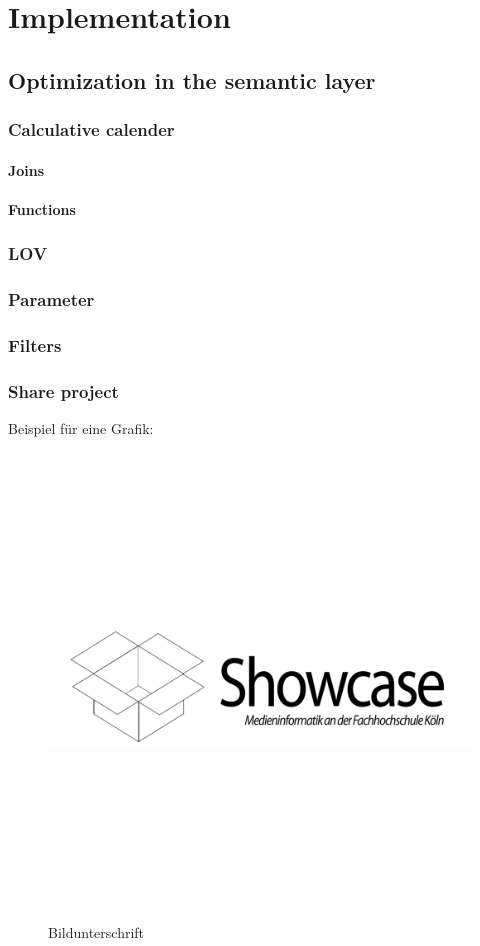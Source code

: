\chapter{Implementation}

\section{Optimization in the semantic layer}
\subsection{Calculative calender}
\subsubsection{Joins}
\subsubsection{Functions}
\subsection{LOV}
\subsection{Parameter}
\subsection{Filters}
\subsection{Share project}

Beispiel für eine Grafik:
\begin{figure}[!ht]
	\centering
		\includegraphics[width=1200pt, height=349pt, width=1.0\textwidth]{images/showcase.pdf}
	\caption{Bildunterschrift}
	\label{fig:showcase}
\end{figure}

